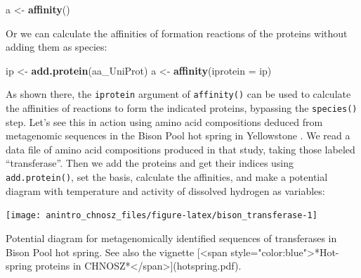 \documentclass[]{tufte-handout}
\newenvironment{Shaded}{}{}
\newcommand{\KeywordTok}[1]{\textcolor[rgb]{0.00,0.44,0.13}{\textbf{#1}}}
\newcommand{\DataTypeTok}[1]{\textcolor[rgb]{0.56,0.13,0.00}{#1}}
\newcommand{\StringTok}[1]{\textcolor[rgb]{0.25,0.44,0.63}{#1}}
\newcommand{\NormalTok}[1]{#1}
\begin{document}
\begin{Shaded}
\begin{Highlighting}[]
\NormalTok{a <-}\StringTok{ }\KeywordTok{affinity}\NormalTok{()}
\end{Highlighting}
\end{Shaded}

Or we can calculate the affinities of formation reactions of the
proteins without adding them as species:

\begin{Shaded}
\begin{Highlighting}[]
\NormalTok{ip <-}\StringTok{ }\KeywordTok{add.protein}\NormalTok{(aa_UniProt)}
\NormalTok{a <-}\StringTok{ }\KeywordTok{affinity}\NormalTok{(}\DataTypeTok{iprotein =}\NormalTok{ ip)}
\end{Highlighting}
\end{Shaded}

As shown there, the \texttt{iprotein} argument of {\texttt{affinity()}}
can be used to calculate the affinities of reactions to form the
indicated proteins, bypassing the {\texttt{species()}} step. Let's see
this in action using amino acid compositions deduced from metagenomic
sequences in the Bison Pool hot spring in Yellowstone \citep{DS11}. We
read a data file of amino acid compositions produced in that study,
taking those labeled ``transferase''. Then we add the proteins and get
their indices using {\texttt{add.protein()}}, set the basis, calculate
the affinities, and make a potential diagram with temperature and
activity of dissolved hydrogen as variables:

\begin{marginfigure}
\texttt{[image: anintro\_chnosz\_files/figure-latex/bison\_transferase-1]} \caption[Potential diagram for metagenomically identified sequences of transferases in Bison Pool hot spring]{Potential diagram for metagenomically identified sequences of transferases in Bison Pool hot spring. See also the vignette [<span style="color:blue">*Hot-spring proteins in CHNOSZ*</span>](hotspring.pdf).}\label{fig:bison_transferase}
\end{marginfigure}
\end{document}
